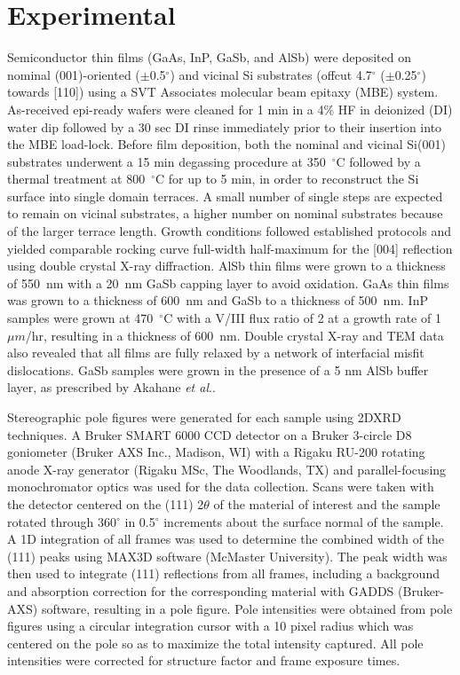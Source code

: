 \section{Experimental} 
Semiconductor thin films (GaAs, InP, GaSb, and AlSb) were deposited on nominal 
(001)-oriented (\(\pm\)0.5\(^\circ\)) and vicinal Si substrates (offcut 
4.7\(^\circ\) (\(\pm\)0.25\(^\circ\)) towards [110]) using a SVT Associates 
molecular beam epitaxy (MBE) system. As-received epi-ready wafers were cleaned 
for 1 min in a 4\% HF in deionized (DI) water dip followed by a 30 sec DI 
rinse immediately prior to their insertion into the MBE load-lock. Before film 
deposition, both the nominal and vicinal Si(001) substrates underwent a 15 min 
degassing procedure at 350~\(^\circ\)C followed by a thermal treatment at 
800~\(^\circ\)C for up to 5 min, in order to reconstruct the Si surface into 
single domain 
terraces\cite{NeergaardWaltenburg1995,S1991,Sakamoto1986,Pehlke1991}. A small 
number of single steps are expected to remain on vicinal substrates, a higher 
number on nominal substrates because of the larger terrace length. Growth 
conditions followed established 
protocols\cite{Akahane2004,Balakrishnan2006a,Fischer1986} and yielded 
comparable rocking curve full-width half-maximum for the [004] reflection 
using double crystal X-ray diffraction. AlSb thin films were grown to a 
thickness of 550~nm with a 20~nm GaSb capping layer to avoid oxidation. GaAs 
thin films was grown to a thickness of 600~nm and GaSb to a thickness of 
500~nm. InP samples were grown at 470~\(^\circ\)C with a V/III flux ratio of 2 
at a growth rate of 1 \(\mu m\)/hr, resulting in a thickness of 600~nm. Double 
crystal X-ray and TEM data also revealed that all films are fully relaxed by a 
network of interfacial misfit dislocations\cite{Vajargah2011}. GaSb samples 
were grown in the presence of a 5 nm AlSb buffer layer, as prescribed by 
Akahane \textit{et al}.\cite{Akahane2004}.

Stereographic pole figures were generated for each sample using 2DXRD 
techniques. A Bruker SMART 6000 CCD detector on a Bruker 3-circle D8 
goniometer (Bruker AXS Inc., Madison, WI) with a Rigaku RU-200 rotating anode 
X-ray generator (Rigaku MSc, The Woodlands, TX) and parallel-focusing 
monochromator optics was used for the data collection. Scans were taken with 
the detector centered on the (111) 2\(\theta\) of the material of interest and 
the sample rotated through 360\(^\circ\) in 0.5\(^\circ\) increments about the 
surface normal of the sample. A 1D integration of all frames was used to 
determine the combined width of the (111) peaks using MAX3D software (McMaster 
University)\cite{Britten2007}. The peak width was then used to integrate (111) 
reflections from all frames, including a background and absorption correction 
for the corresponding material with GADDS (Bruker-AXS) software, resulting in 
a pole figure. Pole intensities were obtained from pole figures using a 
circular integration cursor with a 10 pixel radius which was centered on the 
pole so as to maximize the total intensity captured. All pole intensities were 
corrected for structure factor and frame exposure times.

